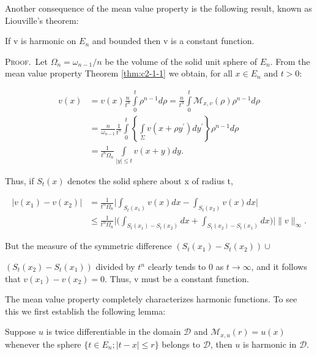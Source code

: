 Another consequence of the mean value property is the following result, known as Liouville's theorem:

\begin{theorem}
\label{thm:c2-1-5}
If v is harmonic on $E_{n}$ and bounded then v is a constant function.
\end{theorem}

\textsc{Proof.}\ Let $\Omega_n = \omega_{n-1}/n$ be the volume of the solid unit sphere of $E_n$. From the mean value property Theorem \ref{thm:c2-1-1} we obtain, for all $x \in E_n$ and $t > 0$:

\[
\begin{aligned}v(x)&=v(x)\frac{n}{t^{n}}\int\limits_{0}^{t}\rho^{n-1}d\rho=\frac{n}{t^{n}}\int\limits_{0}^{t}\mathcal{M}_{x,v}(\rho)\rho^{n-1}d\rho\\&=\frac{n}{\omega_{n-1}}\frac{1}{t^{n}}\int\limits_{0}^{t}\left\{\int\limits_{\Sigma}v(x+\rho y^{\prime})dy^{\prime}\right\}\rho^{n-1}d\rho\\&=\frac{1}{t^{n}\Omega_{n}}\int\limits_{|y|\leq t}v(x+y)dy.\end{aligned}
\]

Thus, if $S_{t}(x)$ denotes the solid sphere about x of radius t,

\[
\begin{aligned}\left|v(x_{1})-v(x_{2})\right|&=\frac{1}{t^{n}\Omega_{n}}\Bigg|\int_{S_{t}(x_{1})}v(x)dx-\int_{S_{t}(x_{2})}v(x)dx\Bigg|\\&\leq\frac{1}{t^{n}\Omega_{n}}\Bigg|\Bigg(\int_{S_{t}(x_{1})-S_{t}(x_{2})}dx+\int_{S_{t}(x_{2})-S_{t}(x_{1})}dx\Bigg)\Bigg|\|v\|_\infty.\end{aligned}
\]

But the measure of the symmetric difference $(S_{t}(x_{1}) - S_{t}(x_{2})) \cup$

$(S_t(x_2) - S_t(x_1))$ divided by $t^n$ clearly tends to 0 as $t \to \infty$, and it follows that $v(x_1) - v(x_2) = 0$. Thus, v must be a constant function.

The mean value property completely characterizes harmonic functions. To see this we first establish the following lemma:

\begin{lemma}
\label{lem:c2-1-6}
Suppose $u$ is twice differentiable in the domain $\mathcal{D}$ and $\mathcal{M}_{x,u}(r) = u(x)$ whenever the sphere $\{t \in E_n; |t - x| \leq r\}$ belongs to $\mathcal{D}$, then $u$ is harmonic in $\mathcal{D}$.
\end{lemma}

